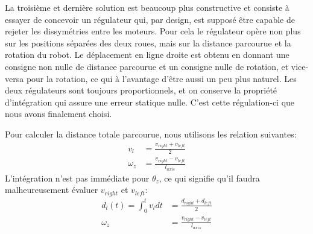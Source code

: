 La troisième et dernière solution est beaucoup plus constructive et consiste à essayer de concevoir un régulateur qui, par design, est supposé être capable de rejeter les dissymétries entre les moteurs. Pour cela le régulateur opère non plus sur les positions séparées des deux roues, mais sur la distance parcourue et la rotation du robot. Le déplacement en ligne droite est obtenu en donnant une consigne non nulle de distance parcourue et un consigne nulle de rotation, et vice-versa pour la rotation, ce qui à l'avantage d'être aussi un peu plus naturel. Les deux régulateurs sont toujours proportionnels, et on conserve la propriété d'intégration qui assure une erreur statique nulle. C'est cette régulation-ci que nous avons finalement choisi.

Pour calculer la distance totale parcourue, nous utilisons les relation suivantes:
\begin{align*}
  v_l &= \frac{v_{right}+v_{left}}{2}\\
  \omega_z &= \frac{v_{right} - v_{left}}{l_{axis}}
\end{align*}
L'intégration n'est pas immédiate pour $\theta_z$, ce qui signifie qu'il faudra malheureusement évaluer $v_{right}$ et $v_{left}$:
\begin{align*}
  d_l(t) = \int_0^tv_l dt &= \frac{d_{right}+d_{left}}{2}\\
  \omega_z &= \frac{v_{right} - v_{left}}{l_{axis}}
\end{align*}
